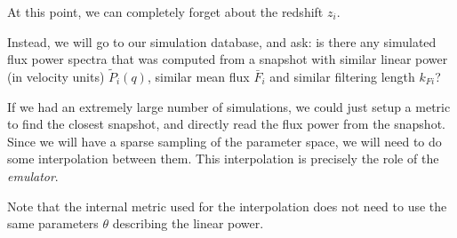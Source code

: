 At this point, we can completely forget about the redshift $z_i$.

Instead, we will go to our simulation database, and ask:
is there any simulated flux power spectra that was computed from a snapshot
with similar linear power (in velocity units) $\tilde P_i(q)$, similar
mean flux $\bar F_i$ and similar filtering length $k_{Fi}$? 

If we had an extremely large number of simulations, we could just setup a
metric to find the closest snapshot, and directly read the flux power
from the snapshot.
Since we will have a sparse sampling of the parameter space, we will need
to do some interpolation between them. 
This interpolation is precisely the role of the \textit{emulator}.

Note that the internal metric used for the interpolation does not need to 
use the same parameters $\theta$ describing the linear power.

